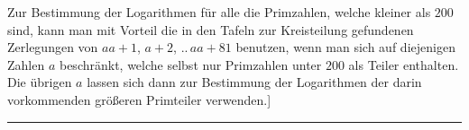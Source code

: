 Zur Bestimmung der Logarithmen für alle die Primzahlen, welche kleiner als $200$ sind, kann man mit Vorteil die in den Tafeln zur Kreisteilung gefundenen Zerlegungen von $aa+1$, $a+2$, $..\,aa+81$ benutzen, wenn man sich auf diejenigen Zahlen $a$ beschränkt, welche selbst nur Primzahlen unter $200$ als Teiler enthalten. Die übrigen $a$ lassen sich dann zur Bestimmung der Logarithmen der darin vorkommenden größeren Primteiler verwenden.]
\par\nobreak\smallskip\noindent\hfill\rule{.32\textwidth}{.3pt}\hfill\mbox{}\par
